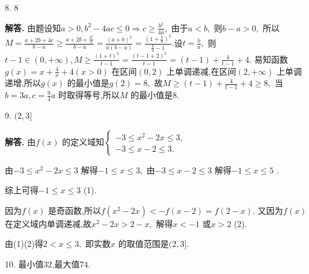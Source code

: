\documentclass[12pt,a4paper,oneside]{ctexart}
\newenvironment{solution}{\par\noindent\textbf{解答. }}{\\\par}
\begin{document}
8. $ 8 $ 

\begin{solution}
    由题设知$ a>0,b^2-4ac\leqslant 0\Rightarrow c\geqslant\frac{b^2}{4a}, $ 由于$ a<b, $ 则$ b-a>0, $ 所以$ M=\frac{a+2b+4c}{b-a}\geqslant\frac{a+2b+\frac{b^2}{a}}{b-a}=\frac{(a+b)^2}{a(b-a)}=\frac{(1+\frac{b}{a})^2}{\frac{b}{a}-1}. $设$ t=\frac{b}{a}, $  则$ t-1\in(0,+\infty),M\geqslant\frac{(1+t)^2}{t-1}=\frac{(t-1+2)^2}{t-1}=(t-1)+\frac{4}{t-1}+4. $ 易知函数$ g(x)=x+\frac{4}{x}+4(x>0) $ 在区间$ (0,2) $ 上单调递减,在区间$ (2,+\infty) $ 上单调递增,所以$ g(x) $ 的最小值是$ g(2)=8, $ 故$ M\geqslant(t-1)+\frac{4}{t-1}+4\geqslant 8, $ 当$ b=3a,c=\frac{9}{4}a $ 时取得等号,所以$ M $ 的最小值是$ 8. $ 
\end{solution}

9. $ (2,3] $ 

\begin{solution}
    由$ f(x) $ 的定义域知$ \begin{cases}
        -3\leqslant x^2-2x \leqslant 3 ,\\
        -3\leqslant x-2\leqslant 3.
    \end{cases} $ 

    由$ -3\leqslant x^2-2x\leqslant 3 $ 解得$ -1\leqslant x\leqslant 3, $ 由$ -3\leqslant x-2\leqslant 3 $ 解得$ -1\leqslant x\leqslant 5 $ .

    综上可得$ -1\leqslant x\leqslant 3 $ (1).

    因为$ f(x) $ 是奇函数,所以$ f(x^2-2x)<-f(x-2)=f(2-x). $ 又因为$ f(x) $ 在定义域内单调递减,故$ x^2-2x>2-x, $ 解得$ x<-1 $ 或$ x>2 $ (2).

    由(1)(2)得$ 2<x\leqslant 3, $ 即实数$ x $ 的取值范围是$ (2,3]. $ 
\end{solution}

10. 最小值$ 32 $,最大值$ 74 $.
\end{document}

